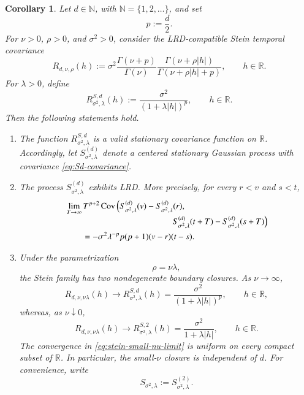 \documentclass[preprint,12pt,authoryear]{elsarticle}
\newtheorem{cor}{Corollary}
\begin{document}
\begin{cor}
\label{cor:stein-power-closure}
Let \(d\in\mathbb N\), with \(\mathbb N=\{1,2,\ldots\}\), and set
\[
p:=\frac d2.
\]
For \(\nu>0\), \(\rho>0\), and \(\sigma^2>0\), consider the
LRD-compatible Stein temporal covariance
\[
R_{d,\nu,\rho}(h)
:=
\sigma^2
\frac{\Gamma(\nu+p)}{\Gamma(\nu)}
\frac{\Gamma(\nu+\rho|h|)}
{\Gamma(\nu+\rho|h|+p)},
\qquad h\in\mathbb R.
\]
For \(\lambda>0\), define
\begin{equation}\label{eq:Sd-covariance}
R^{S,d}_{\sigma^2,\lambda}(h)
:=
\frac{\sigma^2}{(1+\lambda|h|)^p},
\qquad h\in\mathbb R.
\end{equation}
Then the following statements hold.

\begin{enumerate}
\item[(i)]
The function \(R^{S,d}_{\sigma^2,\lambda}\) is a valid stationary
covariance function on \(\mathbb R\). Accordingly, let
\(S^{(d)}_{\sigma^2,\lambda}\) denote a centered stationary Gaussian
process with covariance \eqref{eq:Sd-covariance}.

\item[(ii)]
The process \(S^{(d)}_{\sigma^2,\lambda}\) exhibits LRD. More precisely,
for every \(r<v\) and \(s<t\),
\begin{equation}\label{eq:Sd-lrd-limit}
\begin{aligned}
&\lim_{T\to\infty}T^{p+2}
\operatorname{Cov}\left(
S^{(d)}_{\sigma^2,\lambda}(v)
-
S^{(d)}_{\sigma^2,\lambda}(r),
\right.\\[-1mm]
&\hspace{4.3cm}\left.
S^{(d)}_{\sigma^2,\lambda}(t+T)
-
S^{(d)}_{\sigma^2,\lambda}(s+T)
\right)\\
&\qquad
=
-\sigma^2\lambda^{-p}p(p+1)(v-r)(t-s).
\end{aligned}
\end{equation}

\item[(iii)]
Under the parametrization
\[
\rho=\nu\lambda,
\]
the Stein family has two nondegenerate boundary closures. As
\(\nu\to\infty\),
\begin{equation}\label{eq:stein-to-Sd}
R_{d,\nu,\nu\lambda}(h)
\longrightarrow
R^{S,d}_{\sigma^2,\lambda}(h)
=
\frac{\sigma^2}{(1+\lambda|h|)^p},
\qquad h\in\mathbb R,
\end{equation}
whereas, as \(\nu\downarrow0\),
\begin{equation}\label{eq:stein-small-nu-limit}
R_{d,\nu,\nu\lambda}(h)
\longrightarrow
R^{S,2}_{\sigma^2,\lambda}(h)
=
\frac{\sigma^2}{1+\lambda|h|},
\qquad h\in\mathbb R.
\end{equation}
The convergence in \eqref{eq:stein-small-nu-limit} is uniform on every
compact subset of \(\mathbb R\). In particular, the small-\(\nu\)
closure is independent of \(d\). For convenience, write
\[
S_{\sigma^2,\lambda}
:=
S^{(2)}_{\sigma^2,\lambda}.
\]


\end{enumerate}
\end{cor}
\end{document}
